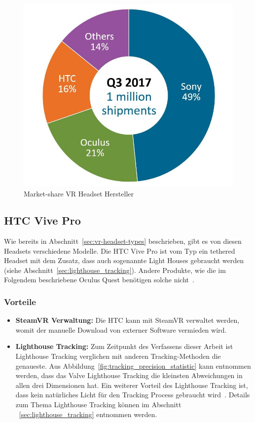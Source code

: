 \begin{figure}
    \centering
    \includegraphics[scale=0.25]{pics/vr_headset_manufacturer_marketshare}
    \caption{Market-share VR Headset Hersteller~\cite{MARTINDALE_2017}}
    \label{fig:vr_headset_manufacturer_marketshare}
\end{figure}

\subsection{HTC Vive Pro}\label{sec:htc-vive}

Wie bereits in Abschnitt~\ref{sec:vr-headset-types} beschrieben, gibt es von diesen Headsets verschiedene Modelle.
Die HTC Vive Pro ist vom Typ ein tethered Headset mit dem Zusatz, dass auch sogenannte Light Houses gebraucht werden (siehe Abschnitt~\ref{sec:lighthouse_tracking}).
Andere Produkte, wie die im Folgendem beschriebene Oculus Quest benötigen solche nicht~\cite{MECHATECH}.

\subsubsection{Vorteile}

\begin{itemize}
    \item \textbf{SteamVR Verwaltung:} Die HTC kann mit SteamVR verwaltet werden, womit der manuelle Download von externer Software vermieden wird.
    \item \textbf{Lighthouse Tracking:} Zum Zeitpunkt des Verfassens dieser Arbeit ist Lighthouse Tracking verglichen mit anderen Tracking-Methoden die genaueste.
    Aus Abbildung~\ref{fig:tracking_precision_statistic} kann entnommen werden, dass das Valve Lighthouse Tracking die kleinsten Abweichungen in allen drei Dimensionen hat.
    Ein weiterer Vorteil des Lighthouse Tracking ist, dass kein natürliches Licht für den Tracking Process gebraucht wird~\cite{Dennis_Ziesecke_2019}.
    Details zum Thema Lighthouse Tracking können im Abschnitt ~\ref{sec:lighthouse_tracking} entnommen werden.
\end{itemize}

